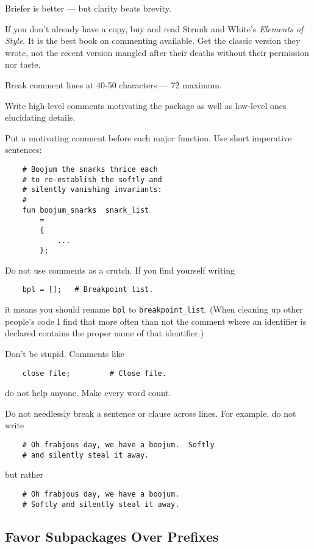 Briefer is better --- but clarity beats brevity. 

If you don't already have a copy, buy and read 
Strunk and White's {\it Elements of Style}. 
It is the best book on commenting available. 
Get the classic version they wrote, not the 
recent version mangled after their deaths 
without their permission nor taste. 

Break comment lines at 40-50 characters --- 72 maximum.

Write high-level comments motivating the package 
as well as low-level ones elucidating details.

Put a motivating comment before each major function. 
Use short imperative sentences: 
\begin{verbatim}
    # Boojum the snarks thrice each
    # to re-establish the softly and
    # silently vanishing invariants:
    #
    fun boojum_snarks  snark_list
        =
        {
            ...
        };
\end{verbatim}

Do not use comments as a crutch.  If you find yourself writing 

\begin{verbatim}
    bpl = [];   # Breakpoint list.
\end{verbatim}

it means you should rename {\tt bpl} to {\tt breakpoint\_list}.  (When 
cleaning up other people's code I find that more often than not the 
comment where an identifier is declared contains the proper name of 
that identifier.)


Don't be stupid.  Comments like
\begin{verbatim}
    close file;         # Close file.
\end{verbatim}
do not help anyone.  Make every word count.


Do not needlessly break a sentence or clause across lines. 
For example, do not write 
\begin{verbatim}
    # Oh frabjous day, we have a boojum.  Softly
    # and silently steal it away.
\end{verbatim}
but rather
\begin{verbatim}
    # Oh frabjous day, we have a boojum.
    # Softly and silently steal it away.
\end{verbatim}


\subsection{Favor Subpackages Over Prefixes}

